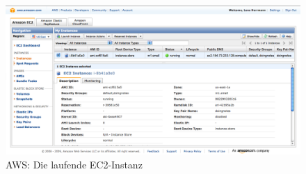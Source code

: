 \begin{figure}[H] 
  \begin{center}
    \includegraphics[width=\textwidth]{grafik/aws-ec2-management-console} 
  \end{center}
  \caption{AWS: Die laufende EC2-Instanz}
  \label{fig:aws-console}
\end{figure}

